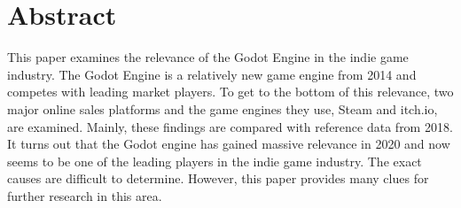 \section*{Abstract}
This paper examines the relevance of the Godot Engine in the indie game industry.
The Godot Engine is a relatively new game engine from 2014 and competes with leading market players.
To get to the bottom of this relevance, two major online sales platforms and the game engines they use, Steam and itch.io, are examined.
Mainly, these findings are compared with reference data from 2018.
It turns out that the Godot engine has gained massive relevance in 2020 and now seems to be one of the leading players in the indie game industry.
The exact causes are difficult to determine.
However, this paper provides many clues for further research in this area.
